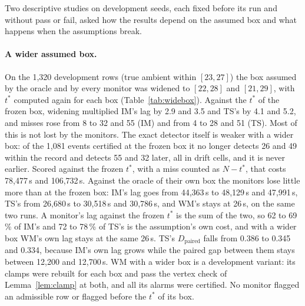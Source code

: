 \documentclass[11pt,a4paper]{article}
\newcommand{\Dp}{D_{\mathrm{paired}}}
\newcommand{\tstar}{t^{\ast}}
\begin{document}
Two descriptive studies on development seeds, each fixed before its run and without pass or fail, asked how the
results depend on the assumed box and what happens when the assumptions break.

\paragraph{A wider assumed box.} On the 1,320 development rows (true ambient within $[23, 27]$) the box assumed by the
oracle and by every monitor was widened to $[22, 28]$ and $[21, 29]$, with $\tstar$ computed again for each box
(Table~\ref{tab:widebox}). Against the $\tstar$ of the frozen box, widening multiplied IM's lag by 2.9 and 3.5 and
TS's by 4.1 and 5.2, and misses rose from 8 to 32 and 55 (IM) and from 4 to 28 and 51 (TS). Most of this is not lost
by the monitors. The exact detector itself is weaker with a wider box: of the 1,081 events certified at the frozen box
it no longer detects 26 and 49 within the record and detects 55 and 32 later, all in drift cells, and it is never
earlier. Scored against the frozen $\tstar$, with a miss counted as $N-\tstar$, that costs 78,477\,s and 106,732\,s.
Against the oracle of their own box the monitors lose little more than at the frozen box: IM's lag goes from
44,363\,s to 48,129\,s and 47,991\,s, TS's from 26,680\,s to 30,518\,s and 30,786\,s, and WM's stays at 26\,s, on the
same two runs. A monitor's lag against the frozen $\tstar$ is the sum of the two, so 62 to 69\,\% of IM's and 72 to
78\,\% of TS's is the assumption's own cost, and with a wider box WM's own lag stays at the same 26\,s. TS's $\Dp$ falls from 0.386 to 0.345 and 0.334, because IM's own lag grows while the paired gap between them stays
between 12,200 and 12,700\,s. WM with a wider box is a development variant: its clamps were rebuilt for each box and
pass the vertex check of Lemma~\ref{lem:clamp} at both, and all its alarms were certified. No monitor flagged an
admissible row or flagged before the $\tstar$ of its box.
\end{document}
